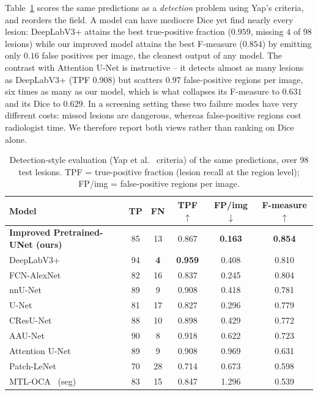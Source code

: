 \documentclass[11pt]{article}
\newcommand{\best}[1]{\textbf{#1}}
\begin{document}
Table~\ref{tab:seg-det} scores the same predictions as a \emph{detection} problem
using Yap's criteria, and reorders the field. A model can have mediocre Dice yet
find nearly every lesion: DeepLabV3+ attains the best true-positive fraction
($0.959$, missing $4$ of $98$ lesions) while our improved model attains the best
F-measure ($0.854$) by emitting only $0.16$ false positives per image, the
cleanest output of any model. The contrast with Attention U-Net is instructive --
it detects almost as many lesions as DeepLabV3+ (TPF $0.908$) but scatters
$0.97$ false-positive regions per image, six times as many as our model, which is
what collapses its F-measure to $0.631$ and its Dice to $0.629$. In a screening
setting these two failure modes have very different costs: missed lesions are
dangerous, whereas false-positive regions cost radiologist time. We therefore
report both views rather than ranking on Dice alone.

\begin{table}[t]
\centering
\caption{Detection-style evaluation (Yap et al.~\cite{yap2018cnn} criteria) of the
same predictions, over $98$ test lesions. TPF = true-positive fraction (lesion
recall at the region level); FP/img = false-positive regions per image.}
\label{tab:seg-det}
\small
\begin{tabular}{@{}lccccc@{}}
\toprule
Model & TP & FN & TPF $\uparrow$ & FP/img $\downarrow$ & F-measure $\uparrow$ \\
\midrule
\best{Improved Pretrained-UNet (ours)} & 85 & 13 & 0.867 & \best{0.163} & \best{0.854} \\
DeepLabV3+~\cite{chen2018deeplabv3plus}      & 94 & \best{4}  & \best{0.959} & 0.408 & 0.810 \\
FCN-AlexNet~\cite{yap2018cnn}                & 82 & 16 & 0.837 & 0.245 & 0.804 \\
nnU-Net~\cite{isensee2021nnunet}             & 89 & 9  & 0.908 & 0.418 & 0.781 \\
U-Net~\cite{ronneberger2015unet}             & 81 & 17 & 0.827 & 0.296 & 0.779 \\
CResU-Net~\cite{derakhshandeh2024cresunet}   & 88 & 10 & 0.898 & 0.429 & 0.772 \\
AAU-Net~\cite{chen2023aaunet}                & 90 & 8  & 0.918 & 0.622 & 0.723 \\
Attention U-Net~\cite{oktay2018attentionunet}& 89 & 9  & 0.908 & 0.969 & 0.631 \\
Patch-LeNet~\cite{yap2018cnn}                & 70 & 28 & 0.714 & 0.673 & 0.598 \\
MTL-OCA~\cite{lu2025multitask} (seg)         & 83 & 15 & 0.847 & 1.296 & 0.539 \\
\bottomrule
\end{tabular}
\end{table}
\end{document}
